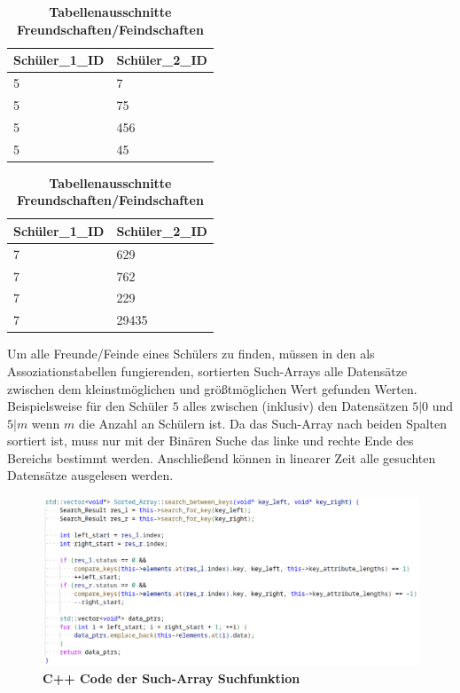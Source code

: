 \documentclass[11pt,a4paper]{article}
\begin{document}
\begin{table}[H]
    \centering
    \begin{tabular}{|l|l|}
        \hline
        Schüler\_1\_ID & Schüler\_2\_ID \\ \hline
        5              & 7              \\ \hline
        5              & 75             \\ \hline
        5              & 456            \\ \hline
        5              & 45             \\ \hline
    \end{tabular}
    \qquad
    \begin{tabular}{|l|l|}
        \hline
        Schüler\_1\_ID & Schüler\_2\_ID \\ \hline
        7              & 629            \\ \hline
        7              & 762            \\ \hline
        7              & 229            \\ \hline
        7              & 29435          \\ \hline
    \end{tabular}
    \caption{\textbf{Tabellenausschnitte Freundschaften/Feindschaften}}
\end{table}

Um alle Freunde/Feinde eines Schülers zu finden, müssen in
den als Assoziationstabellen fungierenden, sortierten Such-Arrays
alle Datensätze zwischen dem kleinstmöglichen und größtmöglichen Wert
gefunden Werten. Beispielsweise für den Schüler $5$ alles zwischen (inklusiv) den Datensätzen
$5 | 0$ und $5 | m$ wenn $m$ die Anzahl an Schülern ist. Da das Such-Array
nach beiden Spalten sortiert ist, muss nur mit der Binären Suche das linke
und rechte Ende des Bereichs bestimmt werden. Anschließend können in linearer
Zeit alle gesuchten Datensätze ausgelesen werden.


\begin{figure}[H]
    \centering
    \includegraphics[width=1.1\textwidth]{./res/code_sort_array.png}
    \caption{\textbf{C++ Code der Such-Array Suchfunktion}}
\end{figure}
\end{document}

